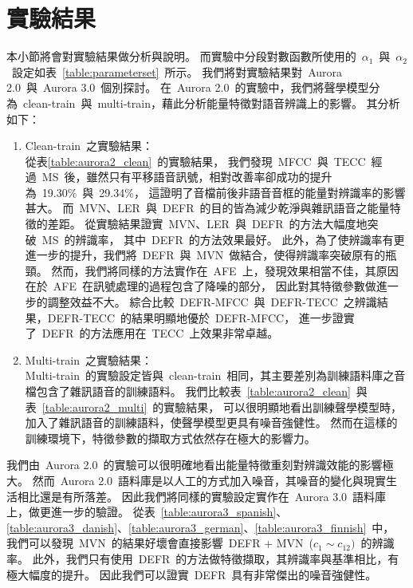 \section{實驗結果}
\label{sec:result}
本小節將會對實驗結果做分析與說明。
而實驗中分段對數函數所使用的~$\alpha_1$~與~$\alpha_2$~設定如表~\ref{table:parameterset}~所示。
我們將對實驗結果對~Aurora 2.0~與~Aurora 3.0~個別探討。
在~Aurora 2.0~的實驗中，我們將聲學模型分為~clean-train~與~multi-train，藉此分析能量特徵對語音辨識上的影響。
其分析如下：
\begin{enumerate}
	\item Clean-train~之實驗結果：	\\
		從表\ref{table:aurora2_clean}~的實驗結果，		
		我們發現~MFCC~與~TECC~經過~MS~後，雖然只有平移語音訊號，相對改善率卻成功的提升為~19.30\%~與~29.34\%，
		這證明了音檔前後非語音音框的能量對辨識率的影響甚大。
		而~MVN、LER~與~DEFR~的目的皆為減少乾淨與雜訊語音之能量特徵的差距。
		從實驗結果證實~MVN、LER~與~DEFR~的方法大幅度地突破~MS~的辨識率，
		其中~DEFR~的方法效果最好。
		此外，為了使辨識率有更進一步的提升，我們將~DEFR~與~MVN~做結合，使得辨識率突破原有的瓶頸。		
		然而，我們將同樣的方法實作在~AFE~上，發現效果相當不佳，其原因在於~AFE~在訊號處理的過程包含了降噪的部分，
		因此對其特徵參數做進一步的調整效益不大。
		綜合比較~DEFR-MFCC~與~DEFR-TECC~之辨識結果，DEFR-TECC~的結果明顯地優於~DEFR-MFCC，
		進一步證實了~DEFR~的方法應用在~TECC~上效果非常卓越。
	\item Multi-train~之實驗結果：	\\
		Multi-train~的實驗設定皆與~clean-train~相同，其主要差別為訓練語料庫之音檔包含了雜訊語音的訓練語料。
		我們比較表~\ref{table:aurora2_clean}~與表~\ref{table:aurora2_multi}~的實驗結果，
		可以很明顯地看出訓練聲學模型時，加入了雜訊語音的訓練語料，使聲學模型更具有噪音強健性。
		然而在這樣的訓練環境下，特徵參數的擷取方式依然存在極大的影響力。		
\end{enumerate}
我們由~Aurora 2.0~的實驗可以很明確地看出能量特徵重刻對辨識效能的影響極大。
然而~Aurora 2.0~語料庫是以人工的方式加入噪音，其噪音的變化與現實生活相比還是有所落差。
因此我們將同樣的實驗設定實作在~Aurora 3.0~語料庫上，做更進一步的驗證。
從表~\ref{table:aurora3_spanish}、\ref{table:aurora3_danish}、\ref{table:aurora3_german}、\ref{table:aurora3_finnish}~中，
我們可以發現~MVN~的結果好壞會直接影響~DEFR + MVN~($c_1 \sim c_{12})$~的辨識率。
此外，我們只有使用~DEFR~的方法做特徵擷取，其辨識率與基準相比，有極大幅度的提升。
因此我們可以證實~DEFR~具有非常傑出的噪音強健性。

